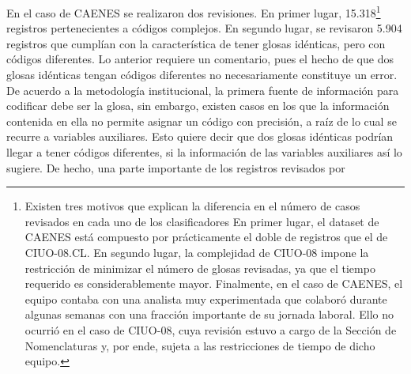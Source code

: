 \documentclass[
  12pt,
  spanish,
]{article}
\begin{document}
En el caso de CAENES se realizaron dos revisiones. En primer lugar,
15.318\footnote{Existen tres motivos que explican la diferencia en el
  número de casos revisados en cada uno de los clasificadores En primer
  lugar, el dataset de CAENES está compuesto por prácticamente el doble
  de registros que el de CIUO-08.CL. En segundo lugar, la complejidad de
  CIUO-08 impone la restricción de minimizar el número de glosas
  revisadas, ya que el tiempo requerido es considerablemente mayor.
  Finalmente, en el caso de CAENES, el equipo contaba con una analista
  muy experimentada que colaboró durante algunas semanas con una
  fracción importante de su jornada laboral. Ello no ocurrió en el caso
  de CIUO-08, cuya revisión estuvo a cargo de la Sección de
  Nomenclaturas y, por ende, sujeta a las restricciones de tiempo de
  dicho equipo.} registros pertenecientes a códigos complejos. En
segundo lugar, se revisaron 5.904 registros que cumplían con la
característica de tener glosas idénticas, pero con códigos diferentes.
Lo anterior requiere un comentario, pues el hecho de que dos glosas
idénticas tengan códigos diferentes no necesariamente constituye un
error. De acuerdo a la metodología institucional, la primera fuente de
información para codificar debe ser la glosa, sin embargo, existen casos
en los que la información contenida en ella no permite asignar un código
con precisión, a raíz de lo cual se recurre a variables auxiliares. Esto
quiere decir que dos glosas idénticas podrían llegar a tener códigos
diferentes, si la información de las variables auxiliares así lo
sugiere. De hecho, una parte importante de los registros revisados por
\end{document}
